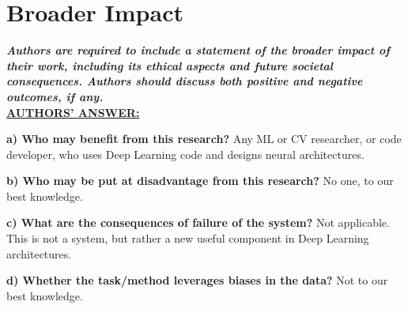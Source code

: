 \section*{Broader Impact}


\textbf{\it Authors are required to include a statement of the broader impact of their work, including its ethical aspects and future societal consequences. 
Authors should discuss both positive and negative outcomes, if any.} \\

\underline{\textbf{AUTHORS' ANSWER:}}

\textbf{a) Who may benefit from this research?}
Any ML or CV researcher, or code developer, who uses Deep Learning code and designs neural architectures.

\textbf{b) Who may be put at disadvantage from this research?}
No one, to our best knowledge.

\textbf{c) What are the consequences of failure of the system?}
Not applicable. This is not a system, but rather a new useful component in Deep Learning architectures.

\textbf{d) Whether the task/method leverages biases in the data?}
Not to our best knowledge.
